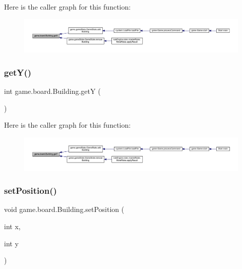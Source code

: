 Here is the caller graph for this function\+:
\nopagebreak
\begin{figure}[H]
\begin{center}
\leavevmode
\includegraphics[width=350pt]{classgame_1_1board_1_1_building_a4b3b28df2d7385677d3f2d08d06797bd_icgraph}
\end{center}
\end{figure}
\mbox{\label{classgame_1_1board_1_1_building_a22ef281a4c474219d4eff1e5bdc0b4b8}} 
\subsubsection{\texorpdfstring{get\+Y()}{getY()}}
{\footnotesize\ttfamily int game.\+board.\+Building.\+getY (\begin{DoxyParamCaption}{ }\end{DoxyParamCaption})\hspace{0.3cm}{\ttfamily [inline]}}

Here is the caller graph for this function\+:
\nopagebreak
\begin{figure}[H]
\begin{center}
\leavevmode
\includegraphics[width=350pt]{classgame_1_1board_1_1_building_a22ef281a4c474219d4eff1e5bdc0b4b8_icgraph}
\end{center}
\end{figure}
\mbox{\label{classgame_1_1board_1_1_building_a837a192497b120047756657004faf3da}} 
\subsubsection{\texorpdfstring{set\+Position()}{setPosition()}}
{\footnotesize\ttfamily void game.\+board.\+Building.\+set\+Position (\begin{DoxyParamCaption}\item[{int}]{x,  }\item[{int}]{y }\end{DoxyParamCaption})\hspace{0.3cm}{\ttfamily [inline]}}

